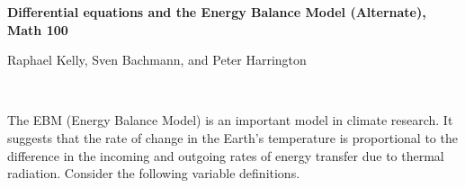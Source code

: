 \documentclass{exam}
\begin{document}
\large{\textbf{Differential equations and the Energy Balance Model (Alternate), Math 100}}


Raphael Kelly, Sven Bachmann, and Peter Harrington

\normalsize
\hrulefill

\

The EBM (Energy Balance Model) is an important model in climate research. It suggests that the rate of change in the Earth's temperature is proportional to the difference in the incoming and outgoing rates of energy transfer due to thermal radiation. Consider the following variable definitions.
    
\end{document}
